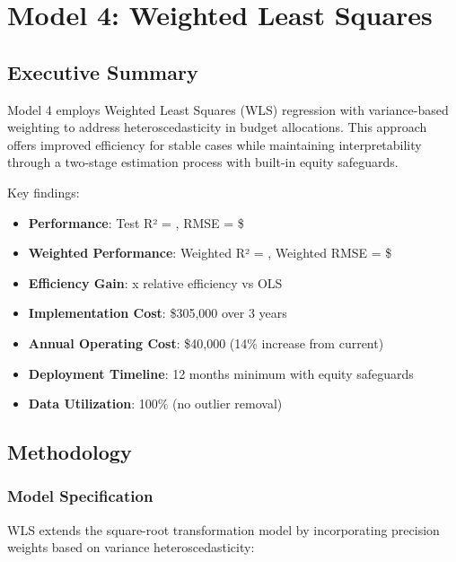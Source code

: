 \chapter{Model 4: Weighted Least Squares}\label{ch:model4}



\section{Executive Summary}

Model 4 employs Weighted Least Squares (WLS) regression with variance-based weighting to address heteroscedasticity in budget allocations. This approach offers improved efficiency for stable cases while maintaining interpretability through a two-stage estimation process with built-in equity safeguards.

Key findings:
\begin{itemize}
    \item \textbf{Performance}: Test R² = \ModelFourRSquaredTest{}, RMSE = \$\ModelFourRMSETest{}
    \item \textbf{Weighted Performance}: Weighted R² = \ModelFourWeightedRSquared{}, Weighted RMSE = \$\ModelFourWeightedRMSE{}
    \item \textbf{Efficiency Gain}: \ModelFourEfficiencyRatio{}x relative efficiency vs OLS
    \item \textbf{Implementation Cost}: \$305,000 over 3 years
    \item \textbf{Annual Operating Cost}: \$40,000 (14\% increase from current)
    \item \textbf{Deployment Timeline}: 12 months minimum with equity safeguards
    \item \textbf{Data Utilization}: 100\% (no outlier removal)
\end{itemize}

\section{Methodology}

\subsection{Model Specification}

WLS extends the square-root transformation model by incorporating precision weights based on variance heteroscedasticity:

